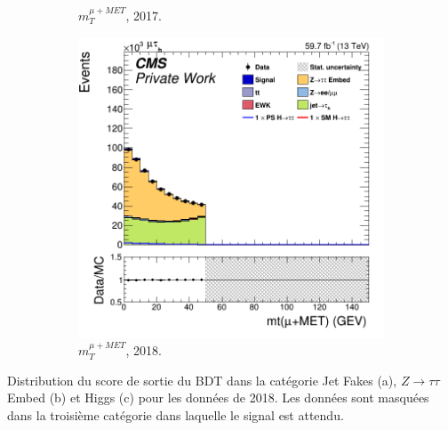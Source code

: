 \begin{figure}
\begin{subfigure}[b]{0.33\linewidth}
    \caption{$m^{\mu+MET}_T$, 2017.} 
    \vspace{0.5ex}
  \end{subfigure} 
    \begin{subfigure}[b]{0.33\linewidth}
    \centering
    \includegraphics[width=\linewidth]{Chapitre7/Images/CtrlPlots/2018/MuMETmt.png} 
    \caption{$m^{\mu+MET}_T$, 2018.} 
    \vspace{0.5ex}
  \end{subfigure} 
  \caption{}
  \label{page4}
\end{figure}

Distribution du score de sortie du BDT dans la catégorie Jet Fakes (a), $Z\rightarrow\tau\tau$ Embed (b) et Higgs (c) pour les données de 2018. Les données sont masquées dans la troisième catégorie dans laquelle le signal est attendu.

